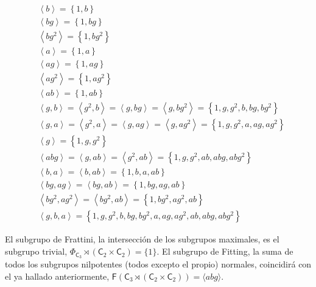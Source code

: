 \documentclass[12pt,a4paper,fleqn,spanish,final,openright]{extbook}
\theoremstyle{definition}
\theoremstyle{remark}
\begin{document}
\begin{align*}
&{\left\langle{b}\right\rangle} = {\left\lbrace{1,b}\right\rbrace}\\
&{\left\langle{bg}\right\rangle} = {\left\lbrace{1,bg}\right\rbrace}\\
&{\left\langle{bg^2}\right\rangle} = {\left\lbrace{1,bg^2}\right\rbrace}\\
&{\left\langle{a}\right\rangle} = {\left\lbrace{1,a}\right\rbrace}\\
&{\left\langle{ag}\right\rangle} = {\left\lbrace{1,ag}\right\rbrace}\\
&{\left\langle{ag^2}\right\rangle} = {\left\lbrace{1,ag^2}\right\rbrace}\\
&{\left\langle{ab}\right\rangle} = {\left\lbrace{1,ab}\right\rbrace}\\
&{\left\langle{g,b}\right\rangle} = {\left\langle{g^2,b}\right\rangle} = {\left\langle{g,bg}\right\rangle} = {\left\langle{g,bg^2}\right\rangle} = {\left\lbrace{1,g,g^2,b,bg,bg^2}\right\rbrace}\\
&{\left\langle{g,a}\right\rangle} = {\left\langle{g^2,a}\right\rangle} ={\left\langle{g,ag}\right\rangle} = {\left\langle{g,ag^2}\right\rangle} = {\left\lbrace{1,g,g^2,a,ag,ag^2}\right\rbrace}\\
&{\left\langle{g}\right\rangle} = {\left\lbrace{1,g,g^2}\right\rbrace}\\
&{\left\langle{abg}\right\rangle} =
{\left\langle{g,ab}\right\rangle} = {\left\langle{g^2,ab}\right\rangle} =  
{\left\lbrace{1,g,g^2,ab,abg,abg^2}\right\rbrace}\\
&{\left\langle{b,a}\right\rangle} = {\left\langle{b,ab}\right\rangle} = {\left\lbrace{1,b,a,ab}\right\rbrace}\\
&{\left\langle{bg,ag}\right\rangle} = {\left\langle{bg,ab}\right\rangle} = {\left\lbrace{1,bg,ag,ab}\right\rbrace}\\
&{\left\langle{bg^2,ag^2}\right\rangle} = {\left\langle{bg^2,ab}\right\rangle} = {\left\lbrace{1,bg^2,ag^2,ab}\right\rbrace}\\
&{\left\langle{g,b,a}\right\rangle} = {\left\lbrace{1,g,g^2,b,bg,bg^2,a,ag,ag^2,ab,abg,abg^2}\right\rbrace}
\end{align*}

El subgrupo de Frattini, la intersección de los subgrupos maximales, es el subgrupo trivial, ${\Phi}_{\mathsf{C}_{3}}\rtimes{\left({\mathsf{C}_{2}}\times{\mathsf{C}_{2}}\right)}= \lbrace 1\rbrace$. El subgrupo de Fitting, la suma de todos los subgrupos nilpotentes (todos excepto el propio) normales, coincidirá con el ya hallado anteriormente, $\mathsf{F}\left(\mathsf{C}_{3}\rtimes\left({\mathsf{C}_{2}}\times{\mathsf{C}_{2}}\right)\right)=\langle abg \rangle$.
\end{document}
